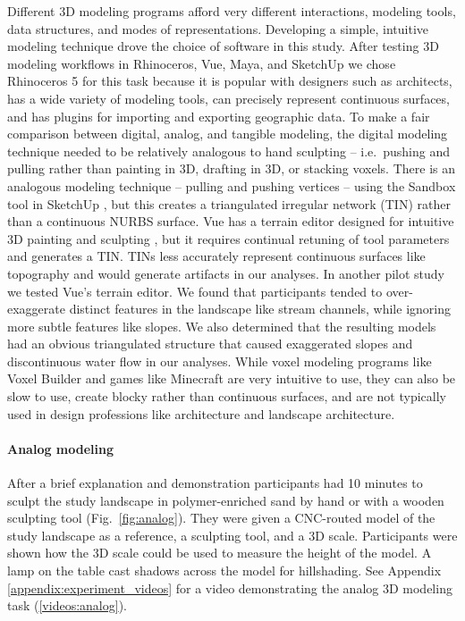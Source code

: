 \documentclass[prodmode,acmtochi]{acmsmall} %
\begin{document}
Different 3D modeling programs afford very different
interactions, modeling tools, data structures, and modes of representations. 
%
Developing a simple, intuitive modeling technique 
drove the choice of software in this study. 
%
After testing 3D modeling workflows in 
Rhinoceros, Vue, Maya, and SketchUp
we chose Rhinoceros 5 for this task because it 
is popular with designers such as architects, 
has a wide variety of modeling tools,
can precisely represent continuous surfaces, 
and has plugins for importing and exporting geographic data. 
%
To make a fair comparison 
between digital, analog, and tangible modeling,
the digital modeling technique 
needed to be relatively analogous to hand sculpting
-- i.e.~pushing and pulling rather than painting in 3D, 
drafting in 3D, or stacking voxels.
%
There is an analogous modeling technique 
-- pulling and pushing vertices -- 
using the Sandbox tool in SketchUp \cite{SketchUp},
but this creates a triangulated irregular network (TIN)
rather than a continuous NURBS surface. 
%
Vue has a terrain editor designed for intuitive 3D painting and sculpting \cite{Vue},
but it requires continual retuning of tool parameters
and generates a TIN. 
%
TINs less accurately represent continuous surfaces like topography
and would generate artifacts in our analyses. 
%
In another pilot study \cite{Harmon2016} 
we tested Vue's terrain editor. 
We found that participants tended to 
over-exaggerate distinct features 
in the landscape like stream channels, 
while ignoring more subtle features like slopes.  
We also determined that the resulting models
had an obvious triangulated structure that caused
exaggerated slopes and discontinuous water flow 
in our analyses. 
%
While voxel modeling programs 
like Voxel Builder %
and games like Minecraft \cite{Minecraft}
are very intuitive to use,
they can also be slow to use,
create blocky rather than
continuous surfaces, 
and are not typically used in design professions 
like architecture and landscape architecture.

\paragraph{Analog modeling}

After a brief explanation and demonstration
participants had 10 minutes to sculpt 
the study landscape in polymer-enriched sand 
by hand or with a wooden sculpting tool (Fig.~\ref{fig:analog}).  
They were given a CNC-routed model of the study landscape 
as a reference, a sculpting tool, and a 3D scale. 
Participants were shown how the 3D scale could be used to 
measure the height of the model. 
A lamp on the table cast shadows across the model for hillshading.
%
See Appendix \ref{appendix:experiment_videos}
for a video demonstrating the analog 3D modeling task (\ref{videos:analog}).
\end{document}
